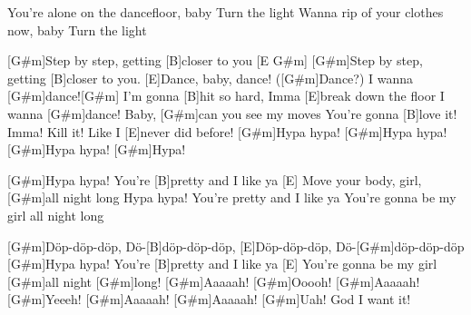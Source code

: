 \begin{guitar}
\begin{spacing}{0.95}
	You're alone on the dancefloor, baby
	Turn the light
	Wanna rip of your clothes now, baby
	Turn the light
	
	[G#m]Step by step, getting [B]closer to you [E G#m]{}
	[G#m]Step by step, getting [B]closer to you. 
	[E]Dance, baby, dance! ([G#m]Dance?)
	I wanna [G#m]dance![G#m] 
	I'm gonna [B]hit so hard, Imma [E]break down the floor
	I wanna [G#m]dance! Baby, [G#m]can you see my moves 
	You're gonna [B]love it! Imma! Kill it! Like I [E]never did before!
	[G#m]Hypa hypa!
	[G#m]Hypa hypa!
	[G#m]Hypa hypa!
	[G#m]Hypa!
	
	\begin{highlightbar}
		[G#m]Hypa hypa! You're [B]pretty and I like ya
		[E] Move your body, girl, [G#m]all night long
		Hypa hypa! You're pretty and I like ya
		You're gonna be my girl all night long
	\end{highlightbar}
	
	[G#m]Döp-döp-döp, Dö-[B]döp-döp-döp, 
	[E]Döp-döp-döp, Dö-[G#m]döp-döp-döp
	[G#m]Hypa hypa! You're [B]pretty and I like ya
	[E] You're gonna be my girl [G#m]all night 
	[G#m]long! [G#m]Aaaaah!
	[G#m]Ooooh! [G#m]Aaaaah!
	[G#m]Yeeeh! [G#m]Aaaaah!
	[G#m]Aaaaah! [G#m]Uah! God I want it! \vspace{-.8em}
\end{spacing}\end{guitar}